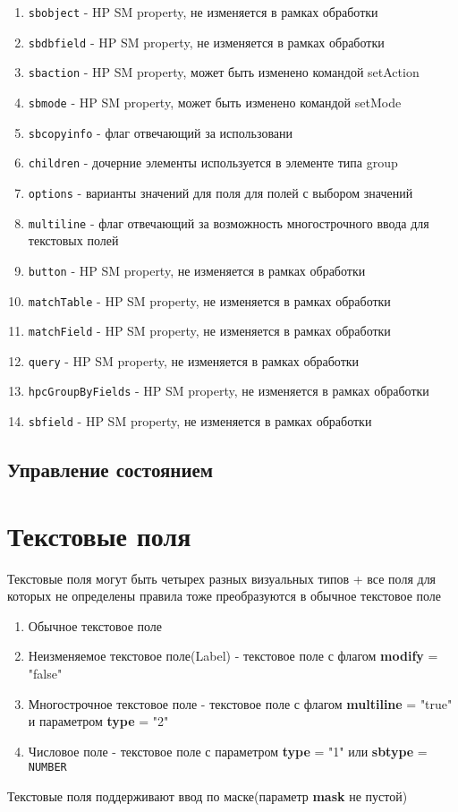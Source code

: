 \documentclass[../index.tex]{subfiles}
\begin{document}
\begin{enumerate}
	\item \verb|sbobject| - HP SM property, не изменяется в рамках обработки
	\item \verb|sbdbfield| - HP SM property, не изменяется в рамках обработки
	\item \verb|sbaction| - HP SM property, может быть изменено командой setAction
	\item \verb|sbmode| - HP SM property, может быть изменено командой setMode
	\item \verb|sbcopyinfo| - флаг отвечающий за использовани
	\item \verb|children| - дочерние элементы используется в элементе типа group
	\item \verb|options| - варианты значений для поля для полей с выбором значений
	\item \verb|multiline| - флаг отвечающий за возможность многострочного ввода для текстовых полей
	\item \verb|button| - HP SM property, не изменяется в рамках обработки
	\item \verb|matchTable| - HP SM property, не изменяется в рамках обработки
	\item \verb|matchField| - HP SM property, не изменяется в рамках обработки
	\item \verb|query| - HP SM property, не изменяется в рамках обработки
	\item \verb|hpcGroupByFields| - HP SM property, не изменяется в рамках обработки
	\item \verb|sbfield| - HP SM property, не изменяется в рамках обработки
\end{enumerate}

\subsection{Управление состоянием}

\section{Текстовые поля}
	Текстовые поля могут быть четырех разных визуальных типов + все поля для которых не определены правила тоже преобразуются в обычное текстовое поле
	\begin{enumerate}
		\item Обычное текстовое поле
		\item Неизменяемое текстовое поле(Label) - текстовое поле с флагом \textbf{modify} = "false"
		\item Многострочное текстовое поле - текстовое поле с флагом \textbf{multiline} = "true" и параметром \textbf{type} = "2"
		\item Числовое поле - текстовое поле с параметром \textbf{type} = "1" или \textbf{sbtype} = \verb|NUMBER|
	\end{enumerate}
	Текстовые поля поддерживают ввод по маске(параметр \textbf{mask} не пустой)
\end{document}
